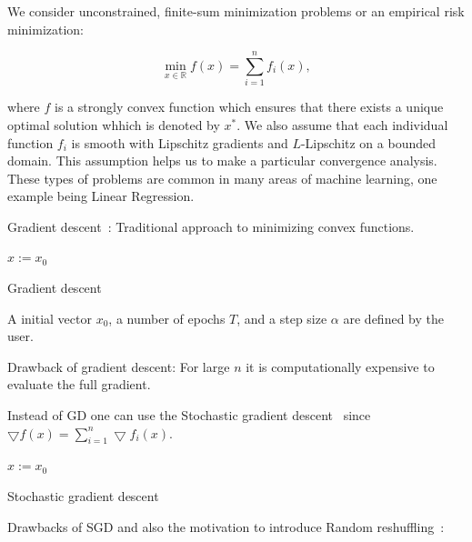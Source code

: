 \documentclass[10pt,conference,compsocconf]{IEEEtran}
\begin{document}
We consider unconstrained, finite-sum minimization problems or an
empirical risk minimization:

\begin{equation}\label{eq:finite-sum}
\min_{x \in \mathbb{R}} f(x) = \sum_{i = 1}^n f_i(x),
\end{equation}


\noindent where $f$ is a strongly convex function which ensures that there
exists a unique optimal solution whhich is denoted by $x^*$. We also assume
that each individual function $f_i$ is smooth with Lipschitz gradients and
\mbox{$L$-Lipschitz} on a bounded domain. This assumption helps us to make
a particular convergence analysis.
These types of problems are common in many areas of machine learning, one example being Linear Regression.

\medskip

Gradient descent~\cite{GD}:
Traditional approach to minimizing convex functions.

\begin{algorithm}
\SetAlgoLined

  $x:= x_0$ \\
 
 \caption{Gradient descent}
\end{algorithm}
\noindent A initial vector $x_0$, a number of epochs $T$, and
a step size $\alpha$ are defined by the user.

\medskip

Drawback of gradient descent: For large $n$ it is computationally
expensive to evaluate the full gradient.

Instead of GD one can use the Stochastic gradient descent~\cite{SGD} since
$\bigtriangledown f(x) = \sum_{i=1}^n \bigtriangledown f_i(x)$.

\begin{algorithm}
\SetAlgoLined

  $x:= x_0$ \\
 
 \caption{Stochastic gradient descent}
\end{algorithm}

Drawbacks of SGD and also the motivation to introduce Random
reshuffling~\cite{COMPONENTFUNCTION}:
\end{document}
